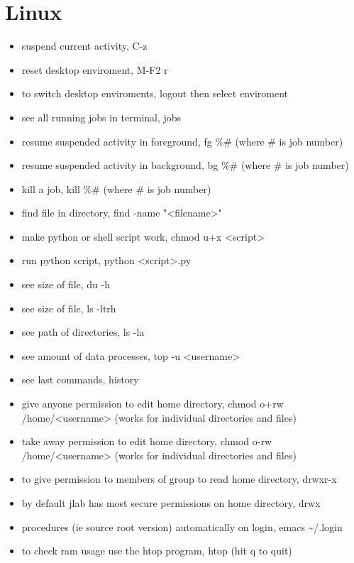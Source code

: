 \documentclass[11pt]{article}
\begin{document}
\section{Linux}
\label{sec:org8a8a01f}
\begin{itemize}
\item suspend current activity, C-z
\item reset desktop enviroment, M-F2 r
\item to switch desktop enviroments, logout then select enviroment
\item see all running jobs in terminal, jobs
\item resume suspended activity in foreground, fg \%\# (where \# is job number)
\item resume suspended activity in background, bg \%\# (where \# is job number)
\item kill a job, kill \%\# (where \# is job number)
\item find file in directory, find -name "<filename>"
\item make python or shell script work, chmod u+x <script>
\item run python script, python <script>.py
\item see size of file, du -h
\item see size of file, ls -ltrh
\item see path of directories, ls -la
\item see amount of data processes, top -u <username>
\item see last commands, history
\item give anyone permission to edit home directory, chmod o+rw /home/<username> (works for individual directories and files)
\item take away permission to edit home directory, chmod o-rw /home/<username> (works for individual directories and files)
\item to give permission to members of group to read home directory, drwxr-x
\item by default jlab has most secure permissions on home directory, drwx
\item procedures (ie source root version) automatically on login, emacs \textasciitilde{}/.login
\item to check ram usage use the htop program, htop (hit q to quit)
\end{itemize}
\end{document}
